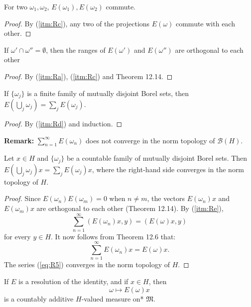 \begin{lemma}
 For two $\omega_1, \omega_2$, \( E(\omega_1), E(\omega_2) \) commute.
\end{lemma}
\begin{proof}
 By (\ref{itm:Rc}), any two of the projections \( E(\omega) \) commute with each other.
\end{proof}

\begin{lemma}
 If \( \omega' \cap \omega'' = \emptyset \),
 then the ranges of \( E(\omega') \) and \( E(\omega'') \) are orthogonal to each other
\end{lemma}
\begin{proof}
 By (\ref{itm:Ra}), (\ref{itm:Rc}) and Theorem 12.14.
\end{proof}

\begin{lemma}
 If $\{\omega_j\}$ is a finite family of mutually disjoint Borel sets, then
 $E(\bigcup_j \omega_j) = \sum_j E(\omega_j)$.
\end{lemma}
\begin{proof}
 By (\ref{itm:Rd}) and induction.
\end{proof}

\textbf{Remark:}
$\sum_{n=1}^{\infty} E(\omega_n)$ does not converge in the norm topology of $\mathcal{B}(H)$.

\begin{lemma}
 Let $x \in H$ and $\{\omega_j\}$ be a countable family of mutually disjoint Borel sets.
 Then $E(\bigcup_j \omega_j)x = \sum_j E(\omega_j)x$, where
 the right-hand side converges in the norm topology of $H$.
\end{lemma}
\begin{proof}
 Since \( E(\omega_n)E(\omega_m) = 0 \) when \( n \neq m \), the vectors \( E(\omega_n)x \) and \( E(\omega_m)x \)
 are orthogonal to each other (Theorem 12.14).
 By (\ref{itm:Re}),
 \begin{equation}
   \label{eq:R5}
   \sum_{n=1}^{\infty} (E(\omega_n)x, y) = (E(\omega)x, y)
 \end{equation}
 for every \( y \in H \).
 It now follows from Theorem 12.6 that:
 \[
  \sum_{n=1}^{\infty} E(\omega_n)x = E(\omega)x.
 \]
 The series (\eqref{eq:R5}) converges in the norm topology of \( H \).
\end{proof}

\begin{proposition}[12.18]
  If \( E \) is a resolution of the identity, and if \( x \in H \), then
  \[
    \omega \mapsto E(\omega)x
  \]
  is a countably additive \( H \)-valued measure on* \( \mathfrak{M} \).
\end{proposition}

